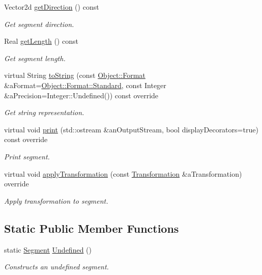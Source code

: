 \begin{DoxyCompactItemize}
Vector2d \hyperlink{classlibrary_1_1math_1_1geom_1_1d2_1_1objects_1_1_segment_af7b2a7dbc7be4941740699a93c63a690}{get\+Direction} () const
\begin{DoxyCompactList}\small\item\em Get segment direction. \end{DoxyCompactList}\item 
Real \hyperlink{classlibrary_1_1math_1_1geom_1_1d2_1_1objects_1_1_segment_a19ed354dd888d7581f14a8217c2af4a5}{get\+Length} () const
\begin{DoxyCompactList}\small\item\em Get segment length. \end{DoxyCompactList}\item 
virtual String \hyperlink{classlibrary_1_1math_1_1geom_1_1d2_1_1objects_1_1_segment_a6efb82e3e5e5d97214b827bc6f8574e3}{to\+String} (const \hyperlink{classlibrary_1_1math_1_1geom_1_1d2_1_1_object_ac8cd61dada4960cfee9a469231621b17}{Object\+::\+Format} \&a\+Format=\hyperlink{classlibrary_1_1math_1_1geom_1_1d2_1_1_object_ac8cd61dada4960cfee9a469231621b17aeb6d8ae6f20283755b339c0dc273988b}{Object\+::\+Format\+::\+Standard}, const Integer \&a\+Precision=Integer\+::\+Undefined()) const override
\begin{DoxyCompactList}\small\item\em Get string representation. \end{DoxyCompactList}\item 
virtual void \hyperlink{classlibrary_1_1math_1_1geom_1_1d2_1_1objects_1_1_segment_abfe0b4983dcb9e26848d29a9b86d4b9c}{print} (std\+::ostream \&an\+Output\+Stream, bool display\+Decorators=true) const override
\begin{DoxyCompactList}\small\item\em Print segment. \end{DoxyCompactList}\item 
virtual void \hyperlink{classlibrary_1_1math_1_1geom_1_1d2_1_1objects_1_1_segment_a5cb71beeb4de3c2c1b84fbfb8546c935}{apply\+Transformation} (const \hyperlink{classlibrary_1_1math_1_1geom_1_1d2_1_1_transformation}{Transformation} \&a\+Transformation) override
\begin{DoxyCompactList}\small\item\em Apply transformation to segment. \end{DoxyCompactList}\end{DoxyCompactItemize}
\subsection*{Static Public Member Functions}
\begin{DoxyCompactItemize}
\item 
static \hyperlink{classlibrary_1_1math_1_1geom_1_1d2_1_1objects_1_1_segment}{Segment} \hyperlink{classlibrary_1_1math_1_1geom_1_1d2_1_1objects_1_1_segment_a8df8fa90e8294482a88fec4eb4c449f5}{Undefined} ()
\begin{DoxyCompactList}\small\item\em Constructs an undefined segment. \end{DoxyCompactList}\end{DoxyCompactItemize}
